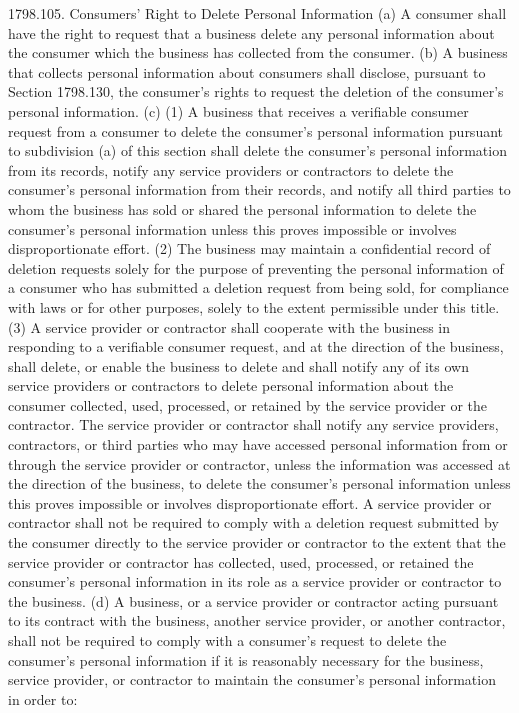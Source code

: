 1798.105.  Consumers’ Right to Delete Personal Information
(a) A consumer shall have the right to request that a business delete any personal information about the consumer which the business has collected from the consumer.
(b) A business that collects personal information about consumers shall disclose, pursuant to Section 1798.130, the consumer’s rights to request the deletion of the consumer’s personal information.
(c) (1) A business that receives a verifiable consumer request from a consumer to delete the consumer’s personal information pursuant to subdivision (a) of this section shall delete the consumer’s personal information from its records, notify any service providers or contractors to delete the consumer’s personal information from their records, and notify all third parties to whom the business has sold or shared the personal information to delete the consumer’s personal information unless this proves impossible or involves disproportionate effort.
(2) The business may maintain a confidential record of deletion requests solely for the purpose of preventing the personal information of a consumer who has submitted a deletion request from being sold, for compliance with laws or for other purposes, solely to the extent permissible under this title.
(3) A service provider or contractor shall cooperate with the business in responding to a verifiable consumer request, and at the direction of the business, shall delete, or enable the business to delete and shall notify any of its own service providers or contractors to delete personal information about the consumer collected, used, processed, or retained by the service provider or the contractor. The service provider or contractor shall notify any service providers, contractors, or third parties who may have accessed personal information from or through the service provider or contractor, unless the information was accessed at the direction of the business, to delete the consumer’s personal information unless this proves impossible or involves disproportionate effort. A service provider or contractor shall not be required to comply with a deletion request submitted by the consumer directly to the service provider or contractor to the extent that the service provider or contractor has collected, used, processed, or retained the consumer’s personal information in its role as a service provider or contractor to the business.
(d) A business, or a service provider or contractor acting pursuant to its contract with the business, another service provider, or another contractor, shall not be required to comply with a consumer’s request to delete the consumer’s personal information if it is reasonably necessary for the business, service provider, or contractor to maintain the consumer’s personal information in order to:
